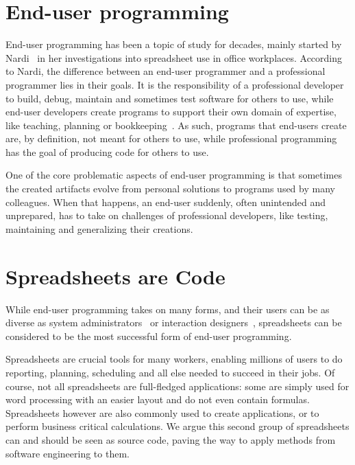 \documentclass[conference]{IEEEtran}
\begin{document}
\section{End-user programming}
End-user programming has been a topic of study for decades, mainly started by Nardi~\cite{Nardi1993} in her investigations into spreadsheet use in office workplaces. According to Nardi, the difference between an end-user programmer and a professional programmer lies in their goals. It is the responsibility of a professional developer to build, debug, maintain and sometimes test software for others to use, while end-user developers create programs to support their own domain of expertise, like teaching, planning or bookkeeping~\cite{Ko2011}. As such, programs that end-users create are, by definition, not meant for others to use, while professional programming has the goal of producing code for others to use. 

One of the core problematic aspects of end-user programming is that sometimes the created artifacts evolve from personal solutions to programs used by many colleagues. When that happens, an end-user suddenly, often unintended and unprepared, has to take on challenges of professional developers, like testing, maintaining and generalizing their creations. 


\section{Spreadsheets are Code}
While end-user programming takes on many forms, and their users can be as diverse as system administrators~\cite{Barrett2004} or interaction designers~\cite{Ko2004, myers_how_2008}, spreadsheets can be considered to be the most successful form of end-user programming.


Spreadsheets are crucial tools for many workers, enabling millions of users to do reporting, planning, scheduling and all else needed to succeed in their jobs. Of course, not all spreadsheets are full-fledged applications: some are simply used for word processing with an easier layout and do not even contain formulas. Spreadsheets however are also commonly used to create applications, or to perform business critical calculations. We argue this second group of spreadsheets can and should be seen as source code, paving the way to apply methods from software engineering to them. 
\end{document}
